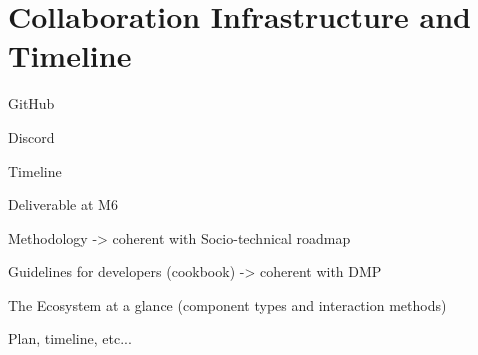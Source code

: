 \chapter{Collaboration Infrastructure and Timeline}\label{ch:infrastructure}
GitHub 

Discord  

Timeline 

Deliverable at M6 

Methodology -> coherent with Socio-technical roadmap 

Guidelines for developers (cookbook) -> coherent with DMP 

The Ecosystem at a glance (component types and interaction methods) 

Plan, timeline, etc... 